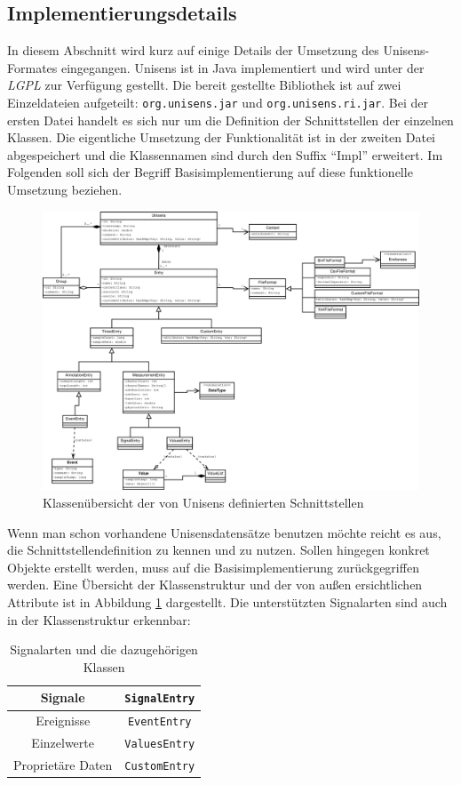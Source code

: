 \subsection{Implementierungsdetails}

In diesem Abschnitt wird kurz auf einige Details der Umsetzung des Unisens-Formates eingegangen.
Unisens ist in Java implementiert und wird unter der \emph{\ac{LGPL}} zur Verf\"ugung gestellt.
Die bereit gestellte Bibliothek ist auf zwei Einzeldateien aufgeteilt: \verb|org.unisens.jar| und \verb|org.unisens.ri.jar|.
Bei der ersten Datei handelt es sich nur um die Definition der Schnittstellen der einzelnen Klassen.
Die eigentliche Umsetzung der Funktionalit\"at ist in der zweiten Datei abgespeichert und die Klassennamen sind durch den Suffix "`Impl"' erweitert.
Im Folgenden soll sich der Begriff Basisimplementierung auf diese funktionelle Umsetzung beziehen.
\begin{figure}
\includegraphics[width=\textwidth]{bilder/unisens_interface.eps}
\caption{Klassen\"ubersicht der von Unisens definierten Schnittstellen}
\label{pic:unisens_interface}
\end{figure}
Wenn man schon vorhandene Unisensdatens\"atze benutzen m\"ochte reicht es aus, die Schnittstellendefinition zu kennen und zu nutzen.
Sollen hingegen konkret Objekte erstellt werden, muss auf die Basisimplementierung zur\"uckgegriffen werden.
Eine \"Ubersicht der Klassenstruktur und der von au\ss en ersichtlichen Attribute ist in Abbildung \ref{pic:unisens_interface} dargestellt.
Die unterst\"utzten Signalarten sind auch in der Klassenstruktur erkennbar:
\begin{table}[h]
\centering
\begin{tabular}{|c|c|}
	\hline Signale & \verb|SignalEntry| \\
	\hline Ereignisse & \verb|EventEntry| \\
	\hline Einzelwerte & \verb|ValuesEntry| \\
	\hline Propriet\"are Daten & \verb|CustomEntry| \\
	\hline
\end{tabular}
\caption{Signalarten und die dazugeh\"origen Klassen}
\label{tab:signal_klassen}
\end{table}

